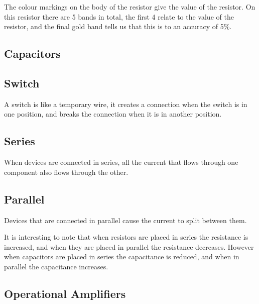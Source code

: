 The colour markings on the body of the resistor give the value of the resistor.
On this resistor there are 5 bands in total, the first 4 relate to the value of the resistor, and the final gold band tells us that this is to an accuracy of 5\%.

%

\subsection{Capacitors}



\subsection{Switch}
A switch is like a temporary wire, it creates a connection when the switch is in one position, and breaks the connection when it is in another position.

\subsection{Series}
When devices are connected in series, all the current that flows through one component also flows through the other.

\subsection{Parallel}
Devices that are connected in parallel cause the current to split between them.

It is interesting to note that when resistors are placed in series the resistance is increased, and when they are placed in parallel the resistance decreases.
However when capacitors are placed in series the capacitance is reduced, and when in parallel the capacitance increases.

\subsection{Operational Amplifiers}


